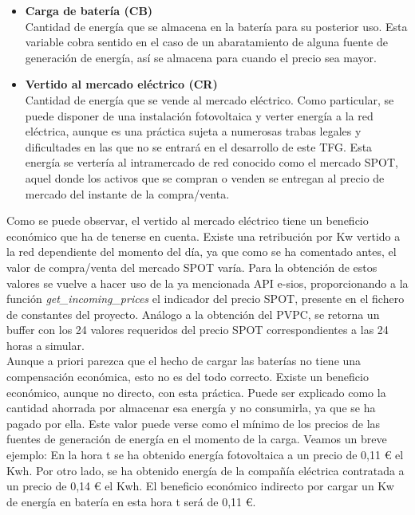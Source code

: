 \begin{itemize}
	\item \textbf{Carga de batería (CB)}\\Cantidad de energía que se almacena en la batería para su posterior uso. Esta variable cobra sentido en el caso de un abaratamiento de alguna fuente de generación de energía, así se almacena para cuando el precio sea mayor.
	\item \textbf{Vertido al mercado eléctrico (CR)}\\Cantidad de energía que se vende al mercado eléctrico. Como particular, se puede disponer de una instalación fotovoltaica y verter energía a la red eléctrica, aunque es una práctica sujeta a numerosas trabas legales y dificultades en las que no se entrará en el desarrollo de este \gls{TFG}. Esta energía se vertería al intramercado de red conocido como el mercado SPOT, aquel donde los activos que se compran o venden se entregan al precio de mercado del instante de la compra/venta.
\end{itemize}

Como se puede observar, el vertido al mercado eléctrico tiene un beneficio económico que ha de tenerse en cuenta. Existe una retribución por Kw vertido a la red dependiente del momento del día, ya que como se ha comentado antes, el valor de compra/venta del mercado SPOT varía. Para la obtención de estos valores se vuelve a hacer uso de la ya mencionada \gls{API} e-sios, proporcionando a la función \textit{get\_incoming\_prices} el indicador del precio SPOT, presente en el fichero de constantes del proyecto. Análogo a la obtención del \gls{PVPC}, se retorna un buffer con los 24 valores requeridos del precio SPOT correspondientes a las 24 horas a simular.\\

Aunque a priori parezca que el hecho de cargar las baterías no tiene una compensación económica, esto no es del todo correcto. Existe un beneficio económico, aunque no directo, con esta práctica. Puede ser explicado como la cantidad ahorrada por almacenar esa energía y no consumirla, ya que se ha pagado por ella. Este valor puede verse como el mínimo de los precios de las fuentes de generación de energía en el momento de la carga. Veamos un breve ejemplo: En la hora t se ha obtenido energía fotovoltaica a un precio de 0,11 € el Kwh. Por otro lado, se ha obtenido energía de la compañía eléctrica contratada a un precio de 0,14 € el Kwh. El beneficio económico indirecto por cargar un Kw de energía en batería en esta hora t será de 0,11 €.

